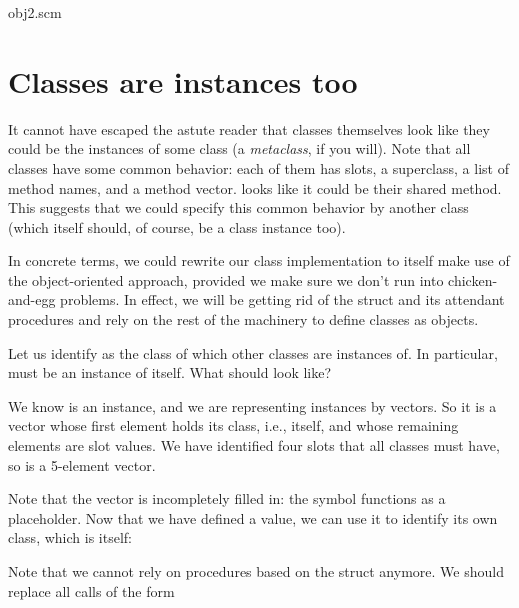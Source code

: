 \scmfilename obj2.scm


\section{Classes are instances too}

It cannot have escaped the astute reader that classes
themselves look like they could be the instances of
some class (a {\em metaclass}, if you will).  Note that
all classes have some common behavior: each of them has
slots, a superclass, a list of method names, and a
method vector.   looks like it could
be their shared method.  This suggests that we could
specify this common behavior by another class (which
itself should, of course, be a class instance too).

In concrete terms, we could rewrite our class
implementation to itself make use of the
object-oriented approach, provided we make sure we
don’t run into chicken-and-egg problems.  In effect, we
will be getting rid of the  struct and its
attendant procedures and rely on the rest of the
machinery to define classes as objects.

Let us identify  as the class of
which other classes are instances of.  In particular,
 must be an instance of itself.  What
should  look like?

We know  is an instance, and we are
representing instances by vectors.  So it is a
vector whose first element holds its class, i.e.,
itself, and whose remaining elements are slot values.
We have identified four slots that all classes must
have, so  is a 5-element vector.


\n Note that the  vector is
incompletely filled in: the symbol
 functions as a
placeholder.  Now that we have defined a
 value, we can use it to identify its
own class, which is itself:


Note that we cannot rely on procedures based on the
 struct anymore.  We should replace all calls
of the form

